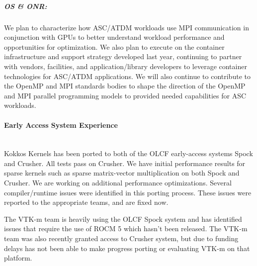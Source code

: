 \subparagraph{OS \& ONR:} We plan to characterize how ASC/ATDM workloads use MPI communication in conjunction with GPUs to better understand workload performance and opportunities for optimization. We also plan to execute on the container infrastructure and support strategy developed last year, continuing to partner with vendors, facilities, and application/library developers to leverage container technologies for ASC/ATDM applications. We will also continue to contribute to the OpenMP and MPI standards bodies to shape the direction of the OpenMP and MPI parallel programming models to provided needed capabilities for ASC workloads.

\paragraph{Early Access System Experience} \leavevmode \\

Kokkos Kernels has been ported to both of the OLCF early-access systems Spock and Crusher. All tests pass on Crusher. We have initial performance results for sparse kernels such as sparse matrix-vector multiplication on both Spock and Crusher. We are working on additional performance optimizations. Several compiler/runtime issues were identified in this porting process.  These issues were reported to the appropriate teams, and are fixed now.

The VTK-m team is heavily using the OLCF Spock system and has identified issues that require the use of ROCM 5 which hasn’t been released. The VTK-m team was also recently granted access to Crusher system, but due to funding delays has not been able to make progress porting or evaluating VTK-m on that platform.



